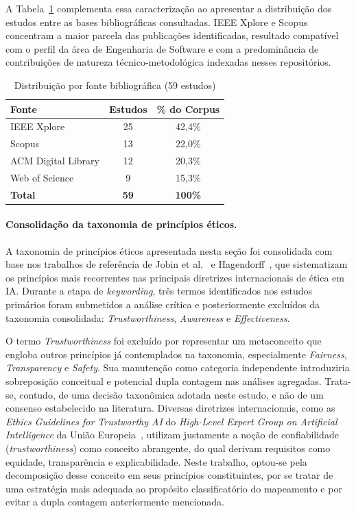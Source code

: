 A Tabela~\ref{tab:source_distribution} complementa essa caracterização ao apresentar a distribuição dos estudos entre as bases bibliográficas consultadas. IEEE Xplore e Scopus concentram a maior parcela das publicações identificadas, resultado compatível com o perfil da área de Engenharia de Software e com a predominância de contribuições de natureza técnico-metodológica indexadas nesses repositórios.

\begin{table}[htbp]
\centering
\caption{Distribuição por fonte bibliográfica (59 estudos)}
\label{tab:source_distribution}
\footnotesize
\begin{tabular}{lcc}
\hline
\textbf{Fonte} & \textbf{Estudos} & \textbf{\% do Corpus} \\
\hline
IEEE Xplore         & 25 & 42,4\% \\
Scopus              & 13 & 22,0\% \\
ACM Digital Library & 12 & 20,3\% \\
Web of Science      & 9  & 15,3\% \\
\hline
\textbf{Total} & \textbf{59} & \textbf{100\%} \\
\hline
\end{tabular}
\end{table}

\paragraph*{Consolidação da taxonomia de princípios éticos.}

A taxonomia de princípios éticos apresentada nesta seção foi consolidada com base nos trabalhos de referência de Jobin et al.~\cite{Jobin2019} e Hagendorff~\cite{Hagendorff2020}, que sistematizam os princípios mais recorrentes nas principais diretrizes internacionais de ética em IA. Durante a etapa de \textit{keywording}, três termos identificados nos estudos primários foram submetidos a análise crítica e posteriormente excluídos da taxonomia consolidada: \textit{Trustworthiness}, \textit{Awareness} e \textit{Effectiveness}.

O termo \textit{Trustworthiness} foi excluído por representar um metaconceito que engloba outros princípios já contemplados na taxonomia, especialmente \textit{Fairness}, \textit{Transparency} e \textit{Safety}. Sua manutenção como categoria independente introduziria sobreposição conceitual e potencial dupla contagem nas análises agregadas. Trata-se, contudo, de uma decisão taxonômica adotada neste estudo, e não de um consenso estabelecido na literatura. Diversas diretrizes internacionais, como as \textit{Ethics Guidelines for Trustworthy AI} do \textit{High-Level Expert Group on Artificial Intelligence} da União Europeia~\cite{AIHLEG2019}, utilizam justamente a noção de confiabilidade (\textit{trustworthiness}) como conceito abrangente, do qual derivam requisitos como equidade, transparência e explicabilidade. Neste trabalho, optou-se pela decomposição desse conceito em seus princípios constituintes, por se tratar de uma estratégia mais adequada ao propósito classificatório do mapeamento e por evitar a dupla contagem anteriormente mencionada.

